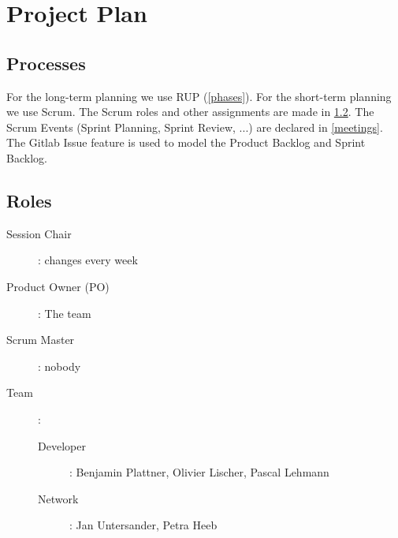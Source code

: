 \chapter{Project Plan}


\section{Processes}
For the long-term planning we use RUP (\ref{phases}).
For the short-term planning we use Scrum.
The Scrum roles and other assignments are made in \ref{roles}.
The Scrum Events (Sprint Planning, Sprint Review, ...) are declared in \ref{meetings}.
The Gitlab Issue feature is used to model the Product Backlog and Sprint Backlog.

\section{Roles}
\label{roles}
\begin{description}
  \item[Session Chair]: changes every week
  \item[Product Owner (PO)]: The team
  \item[Scrum Master]: nobody
  \item[Team]:
    \begin{description}
    \item[Developer]: Benjamin Plattner, Olivier Lischer, Pascal Lehmann
    \item[Network]: Jan Untersander, Petra Heeb
    \end{description}
\end{description}

